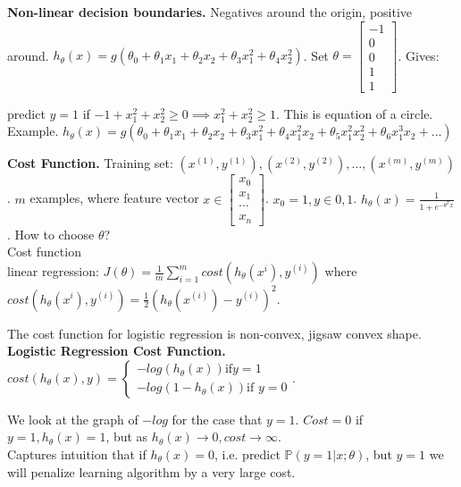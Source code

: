 \documentclass[a4 paper, 11 pt]{article}
\begin{document}
\textbf{Non-linear decision boundaries.} Negatives around the origin, positive around. $h_\theta(x) = g(\theta_0 + \theta_1x_1 + \theta_2x_2 + \theta_3x^2_1 + \theta_4x^2_2)$. Set $\theta = \begin{bmatrix} -1\\0\\0\\1\\1 \end{bmatrix}$. Gives:

predict $y=1$ if $-1+ x^2_1+x^2_2 \ge 0 \implies x_1^2 + x_2^2 \ge 1$. This is equation of a circle.\\

Example. $h_\theta(x) = g(\theta_0 + \theta_1x_1 + \theta_2x_2 + \theta_3x_1^2 + \theta_4x^2_1x_2 + \theta_5x_1^2x_2^2 + \theta_6x_1^3x_2 + \ldots)$

\textbf{Cost Function.} Training set: ${(x^{(1)},y^{(1)}),(x^{(2)},y^{(2)}),\ldots,(x^{(m)},y^{(m)})}$. $m$ examples, where feature vector $x \in \begin{bmatrix} x_0 \\ x_1 \\ \cdots \\ x_n \end{bmatrix}$. $x_0 = 1, y \in {0,1}$. $h_\theta(x) = \frac{1}{1+e^{-\theta^Tx}}$. How to choose $\theta$? \\

Cost function\\
linear regression: $J(\theta) = \frac{1}{m}\sum_{i=1}^m cost(h_\theta(x^{i}),y^{(i)})$ where $cost(h_\theta(x^{i}),y^{(i)}) = \frac{1}{2}(h_\theta(x^{(i)}) - y^{(i)})^2$.

The cost function for logistic regression is non-convex, jigsaw convex shape. \\

\textbf{Logistic Regression Cost Function.} $cost(h_\theta(x), y) = \begin{cases}-log(h_\theta(x)) \mbox{if} y = 1 \\ -log(1-h_\theta(x)) \mbox{if } y=0\end{cases}$.

We look at the graph of $-log$ for the case that $y=1$. $Cost = 0$ if $y= 1, h_\theta(x) = 1$, but as $h_\theta(x) \to 0, cost \to \infty$.\\
Captures intuition that if $h_\theta(x) = 0$, i.e. predict $\mathbb{P}(y=1 | x; \theta)$, but $y=1$ we will penalize learning algorithm by a very large cost.
\end{document}
